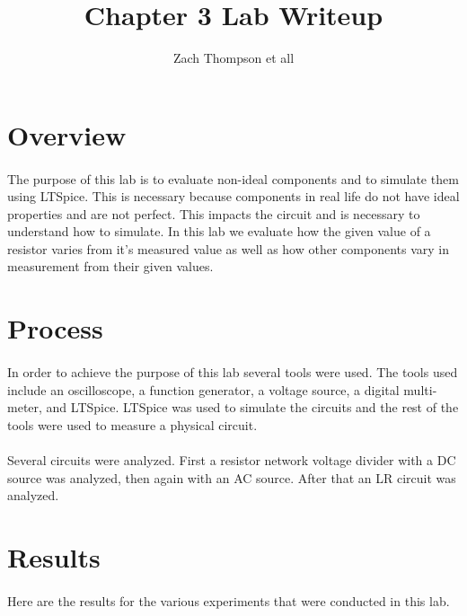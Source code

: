 \documentclass{article}
\title{Chapter 3 Lab Writeup}
\author{Zach Thompson et all}
\begin{document}
\maketitle{}

\section*{Overview}
\paragraph{}
The purpose of this lab is to evaluate non-ideal components and to simulate them using LTSpice. This is necessary because components in real life
do not have ideal properties and are not perfect. This impacts the circuit and is necessary to understand how to simulate. In this lab we evaluate how the 
given value of a resistor varies from it's measured value as well as how other components vary in measurement from their given values. 


\section*{Process}
\paragraph{}
In order to achieve the purpose of this lab several tools were used. The tools used include an oscilloscope, a function generator, a voltage source, 
a digital multi-meter, and LTSpice. LTSpice was used to simulate the circuits and the rest of the tools were used to measure a physical circuit.

\paragraph{}
Several circuits were analyzed. First a resistor network voltage divider with a DC source was analyzed, then again with an AC source. After that an LR circuit 
was analyzed.

\section*{Results}
\paragraph{}
Here are the results for the various experiments that were conducted in this lab.
\end{document}
